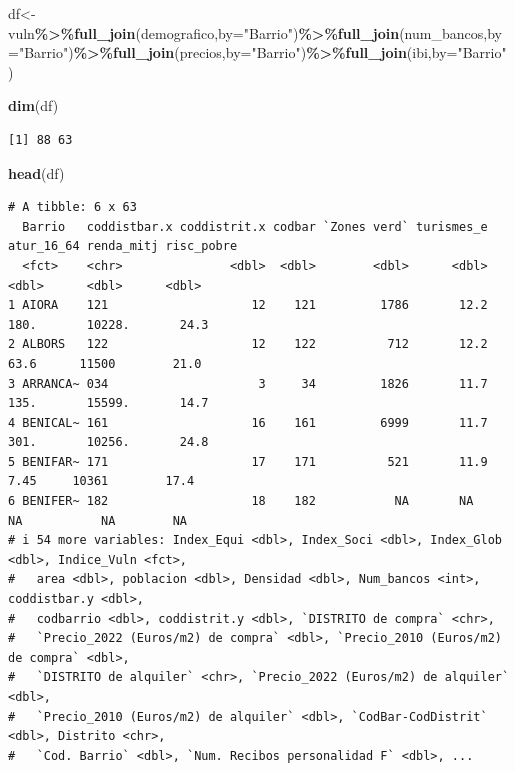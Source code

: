 \documentclass[notspecified,article,submit,moreauthors,pdftex]{Definitions/mdpi}
\newenvironment{Shaded}{\begin{snugshade}}{\end{snugshade}}
\newcommand{\AttributeTok}[1]{\textcolor[rgb]{0.13,0.29,0.53}{#1}}
\newcommand{\FunctionTok}[1]{\textcolor[rgb]{0.13,0.29,0.53}{\textbf{#1}}}
\newcommand{\NormalTok}[1]{#1}
\newcommand{\OtherTok}[1]{\textcolor[rgb]{0.56,0.35,0.01}{#1}}
\newcommand{\SpecialCharTok}[1]{\textcolor[rgb]{0.81,0.36,0.00}{\textbf{#1}}}
\newcommand{\StringTok}[1]{\textcolor[rgb]{0.31,0.60,0.02}{#1}}
\begin{document}
\begin{Shaded}
\begin{Highlighting}[]
\NormalTok{df}\OtherTok{\textless{}{-}}\NormalTok{vuln}\SpecialCharTok{\%\textgreater{}\%}\FunctionTok{full\_join}\NormalTok{(demografico,}\AttributeTok{by=}\StringTok{"Barrio"}\NormalTok{)}\SpecialCharTok{\%\textgreater{}\%}\FunctionTok{full\_join}\NormalTok{(num\_bancos,}\AttributeTok{by=}\StringTok{"Barrio"}\NormalTok{)}\SpecialCharTok{\%\textgreater{}\%}\FunctionTok{full\_join}\NormalTok{(precios,}\AttributeTok{by=}\StringTok{"Barrio"}\NormalTok{)}\SpecialCharTok{\%\textgreater{}\%}\FunctionTok{full\_join}\NormalTok{(ibi,}\AttributeTok{by=}\StringTok{"Barrio"}\NormalTok{)}

\FunctionTok{dim}\NormalTok{(df)}
\end{Highlighting}
\end{Shaded}

\begin{verbatim}
[1] 88 63
\end{verbatim}

\begin{Shaded}
\begin{Highlighting}[]
\FunctionTok{head}\NormalTok{(df)}
\end{Highlighting}
\end{Shaded}

\begin{verbatim}
# A tibble: 6 x 63
  Barrio   coddistbar.x coddistrit.x codbar `Zones verd` turismes_e atur_16_64 renda_mitj risc_pobre
  <fct>    <chr>               <dbl>  <dbl>        <dbl>      <dbl>      <dbl>      <dbl>      <dbl>
1 AIORA    121                    12    121         1786       12.2     180.       10228.       24.3
2 ALBORS   122                    12    122          712       12.2      63.6      11500        21.0
3 ARRANCA~ 034                     3     34         1826       11.7     135.       15599.       14.7
4 BENICAL~ 161                    16    161         6999       11.7     301.       10256.       24.8
5 BENIFAR~ 171                    17    171          521       11.9       7.45     10361        17.4
6 BENIFER~ 182                    18    182           NA       NA        NA           NA        NA  
# i 54 more variables: Index_Equi <dbl>, Index_Soci <dbl>, Index_Glob <dbl>, Indice_Vuln <fct>,
#   area <dbl>, poblacion <dbl>, Densidad <dbl>, Num_bancos <int>, coddistbar.y <dbl>,
#   codbarrio <dbl>, coddistrit.y <dbl>, `DISTRITO de compra` <chr>,
#   `Precio_2022 (Euros/m2) de compra` <dbl>, `Precio_2010 (Euros/m2) de compra` <dbl>,
#   `DISTRITO de alquiler` <chr>, `Precio_2022 (Euros/m2) de alquiler` <dbl>,
#   `Precio_2010 (Euros/m2) de alquiler` <dbl>, `CodBar-CodDistrit` <dbl>, Distrito <chr>,
#   `Cod. Barrio` <dbl>, `Num. Recibos personalidad F` <dbl>, ...
\end{verbatim}
\end{document}

